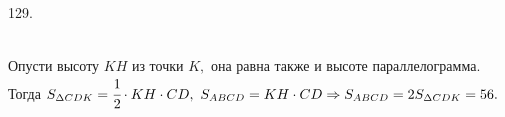129. \begin{figure}[ht!]
\end{figure}\\
Опусти высоту $KH$ из точки $K,$ она равна также и высоте параллелограмма. Тогда $S_{\Delta CDK}=\cfrac{1}{2}\cdot KH\cdot CD,\ S_{ABCD}=KH\cdot CD\Rightarrow
S_{ABCD}=2S_{\Delta CDK}=56.$\\
